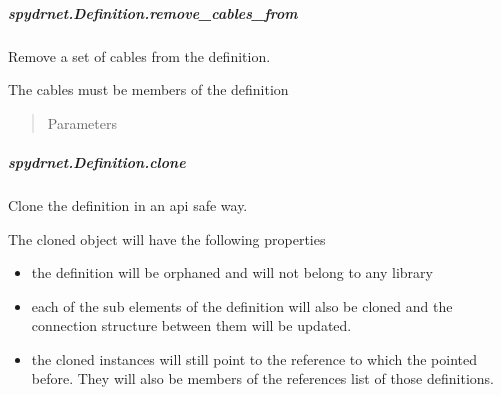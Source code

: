 \documentclass[letterpaper,10pt,english,openany,oneside]{sphinxmanual}
\begin{document}
\subparagraph{spydrnet.Definition.remove\_cables\_from}
\label{\detokenize{reference/classes/generated/spydrnet.Definition.remove_cables_from:spydrnet-definition-remove-cables-from}}\label{\detokenize{reference/classes/generated/spydrnet.Definition.remove_cables_from::doc}}

\begin{fulllineitems}
\label{\detokenize{reference/classes/generated/spydrnet.Definition.remove_cables_from:spydrnet.Definition.remove_cables_from}}
Remove a set of cables from the definition.

The cables must be members of the definition
\begin{quote}\begin{description}
\item[{Parameters}] \leavevmode
{}

\end{description}\end{quote}

\end{fulllineitems}



\subparagraph{spydrnet.Definition.clone}
\label{\detokenize{reference/classes/generated/spydrnet.Definition.clone:spydrnet-definition-clone}}\label{\detokenize{reference/classes/generated/spydrnet.Definition.clone::doc}}

\begin{fulllineitems}
\label{\detokenize{reference/classes/generated/spydrnet.Definition.clone:spydrnet.Definition.clone}}
Clone the definition in an api safe way.

The cloned object will have the following properties
\begin{itemize}
\item {} 
the definition will be orphaned and will not belong to any library

\item {} 
each of the sub elements of the definition will also be cloned and the connection structure between them will be updated.

\item {} 
the cloned instances will still point to the reference to which the pointed before. They will also be members of the references list of those definitions.

\end{itemize}

\end{fulllineitems}
\end{document}
